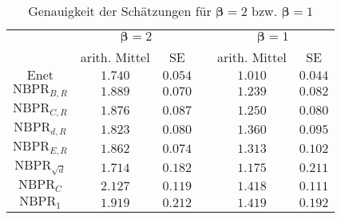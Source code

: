 \documentclass{beamer}
\begin{document}
\begin{frame}
\begin{table}[h]
\begin{tabular}{ccclcc}
\multicolumn{1}{l}{}     & \multicolumn{2}{c}{$\boldsymbol{\beta}=2$} &  & \multicolumn{2}{c}{$\boldsymbol{\beta}=1$} \\ \cline{2-3} \cline{5-6} 
\multicolumn{1}{l}{}     & arith. Mittel           & SE               &  & arith. Mittel           & SE               \\ \cline{2-3} \cline{5-6} 
$\text{Enet}$            & $1.740$                 & $0.054$          &  & $1.010$                 & $0.044$          \\
$\text{NBPR}_{B,R}$      & $1.889$                 & $0.070$          &  & $1.239$                 & $0.082$          \\
$\text{NBPR}_{C,R}$      & $1.876$                 & $0.087$          &  & $1.250$                 & $0.080$          \\
$\text{NBPR}_{d,R}$      & $1.823$                 & $0.080$          &  & $1.360$                 & $0.095$          \\
$\text{NBPR}_{E,R}$      & $1.862$                 & $0.074$          &  & $1.313$                 & $0.102$          \\
$\text{NBPR}_{\sqrt{d}}$ & $1.714$                 & $0.182$          &  & $1.175$                 & $0.211$          \\
$\text{NBPR}_{C}$        & $2.127$                 & $0.119$          &  & $1.418$                 & $0.111$          \\
$\text{NBPR}_{1}$        & $1.919$                 & $0.212$          &  & $1.419$                 & $0.192$         
\end{tabular}
\caption{Genauigkeit der Schätzungen für $\boldsymbol{\beta}=2$ bzw. $\boldsymbol{\beta}=1$}
\end{table}
\end{frame}
\end{document}
